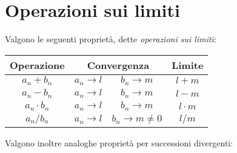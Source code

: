 \documentclass{article}
\begin{document}
\section*{Operazioni sui limiti}
Valgono le seguenti proprietà, dette \textit{operazioni sui limiti}:
\begin{center}
    \begin{tabular}{|c|c|c|c|}
        \hline
        \textbf{Operazione} & \multicolumn{2}{c|}{\textbf{Convergenza}} & \textbf{Limite}                \\
        \hline
        $a_n+b_n$           & $a_n\to l$                                & $b_n\to m$       & $l+m$       \\
        \hline
        $a_n-b_n$           & $a_n\to l$                                & $b_n\to m$       & $l-m$       \\
        \hline
        ${a_n}\cdot{b_n}$   & ${a_n}\to{l}$                             & ${b_n}\to{m}$    & $l \cdot m$ \\
        \hline
        $a_n/b_n$           & $a_n\to l$                                & $b_n\to m\neq 0$ & $l/m$       \\
        \hline
    \end{tabular}
\end{center}
Valgono inoltre analoghe proprietà per successioni divergenti:
\end{document}
